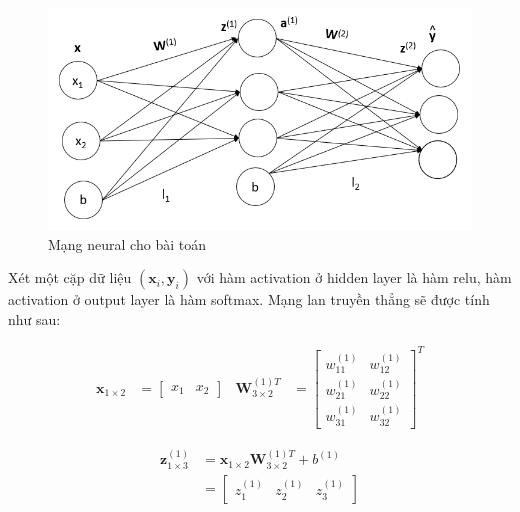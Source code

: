 \begin{figure}[H]
\begin{center}
	\includegraphics[scale=1]{chap3/image/myNeuralNetwork.png}
	\caption{Mạng neural cho bài toán }
	\label{fig:baitoan}
\end{center}
\end{figure}


Xét một cặp dữ liệu $(\textbf{x}_i,\textbf{y}_i)$ với hàm activation ở hidden layer là hàm relu, hàm activation ở output layer là hàm softmax. Mạng lan truyền thẳng sẽ được tính như sau:

\begin{equation}
\label{eq:s1}
\begin{aligned}
\textbf{x}_{1\times 2}& = \begin{bmatrix}
x_1 &x_2
\end{bmatrix}&
\textbf{W}^{(1)T}_{3{\times}2} &	=  \begin{bmatrix}
	w^{(1)}_{11} &w^{(1)}_{12} \\[6pt]
	w^{(1)}_{21} &w^{(1)}_{22} \\[6pt]
	w^{(1)}_{31} &w^{(1)}_{32} 
\end{bmatrix}^{T}
\end{aligned}
\end{equation}

	\begin{equation}
	\label{eq:s2}
	\begin{aligned}		
	\textbf{z}^{(1)}_{1 \times 3}	&	=\textbf{x}_{1\times 2}\textbf{W}^{(1)T}_{3\times 2} +b^{(1)}\\
	&	=\begin{bmatrix}
	z^{(1)}_{1} &z^{(1)}_{2} &z^{(1)}_{3} 
	\end{bmatrix}		
	\end{aligned}
	\end{equation}


